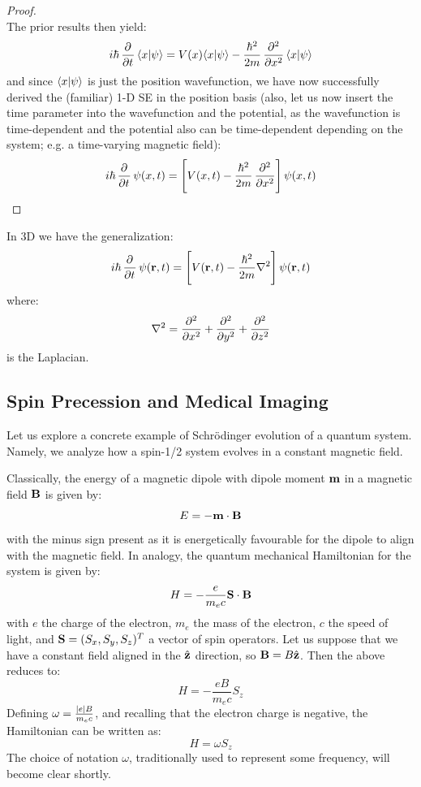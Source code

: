 \begin{proof}
\begin{equation}
    \end{equation}
    The prior results then yield:
    \begin{equation}
        i\hbar\dpd{}{t}\braket{x}{\psi} = V(x)\braket{x}{\psi} - \frac{\hbar^2}{2m}\dpd[2]{}{x}\braket{x}{\psi}
    \end{equation}
    and since $\langle x \lvert \psi \rangle$ is just the position wavefunction, we have now successfully derived the (familiar) 1-D SE in the position basis (also, let us now insert the time parameter into the wavefunction and the potential, as the wavefunction is time-dependent and the potential also can be time-dependent depending on the system; e.g. a time-varying magnetic field):
    \begin{equation}
        i\hbar\dpd{}{t}\psi(x, t) = \left[V(x, t) -\frac{\hbar^2}{2m}\dpd[2]{}{x}\right]\psi(x, t)
    \end{equation}
\end{proof}
In 3D we have the generalization:
\begin{equation}
    i\hbar\dpd{}{t}\psi(\v{r}, t) = \left[V(\v{r}, t) - \frac{\hbar^2}{2m}\nabla^2\right]\psi(\v{r}, t)
\end{equation}
where:
\begin{equation}
    \nabla^2 = \dpd[2]{}{x} + \dpd[2]{}{y} + \dpd[2]{}{z}
\end{equation}
is the Laplacian.

\subsection{Spin Precession and Medical Imaging}
Let us explore a concrete example of Schr\"{o}dinger evolution of a quantum system. Namely, we analyze how a spin-1/2 system evolves in a constant magnetic field.

Classically, the energy of a magnetic dipole with dipole moment $\mathbf{m}$ in a magnetic field $\mathbf{B}$ is given by:
\begin{equation}
    E = -\mathbf{m} \cdot \mathbf{B}
\end{equation}
with the minus sign present as it is energetically favourable for the dipole to align with the magnetic field. In analogy, the quantum mechanical Hamiltonian for the system is given by:
\begin{equation}
    H = -\frac{e}{m_e c}\mathbf{S} \cdot \mathbf{B}
\end{equation}
with $e$ the charge of the electron, $m_e$ the mass of the electron, $c$ the speed of light, and $\mathbf{S} = (S_x, S_y, S_z)^T$ a vector of spin operators. Let us suppose that we have a constant field aligned in the $\hat{\mathbf{z}}$ direction, so $\mathbf{B} = B\hat{\mathbf{z}}$. Then the above reduces to:
\begin{equation}
    H = -\frac{eB}{m_e c}S_z
\end{equation}
Defining $\omega = \frac{\lvert e \rvert B}{m_e c}$, and recalling that the electron charge is negative, the Hamiltonian can be written as:
\begin{equation}
    H = \omega S_z
\end{equation}
The choice of notation $\omega$, traditionally used to represent some frequency, will become clear shortly.

